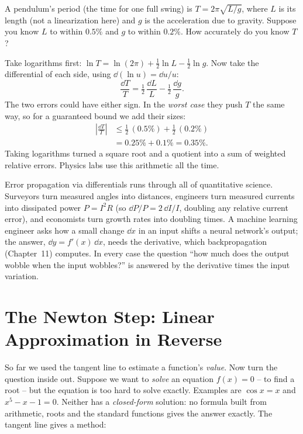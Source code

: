 \begin{example}
\label{ch14:ex-combine}
A pendulum's period (the time for one full swing) is $T = 2\pi\sqrt{L/g}$, where
$L$ is its length (not a linearization here) and $g$ is the acceleration due to
gravity. Suppose you know $L$ to within
$0.5\%$ and $g$ to within $0.2\%$. How accurately do you know $T$?

Take logarithms first: $\ln T = \ln(2\pi) + \tfrac12\ln L - \tfrac12 \ln g$.
Now take the differential of each side, using $\dd(\ln u)=\dd u/u$:
\[
\frac{\dd T}{T} = \tfrac12\,\frac{\dd L}{L} - \tfrac12\,\frac{\dd g}{g}.
\]
The two errors could have either sign. In the \emph{worst case} they push $T$ the
same way, so for a guaranteed bound we add their sizes:
\begin{align*}
\left|\frac{\dd T}{T}\right| &\le \tfrac12\,(0.5\%) + \tfrac12\,(0.2\%)\\
&= 0.25\% + 0.1\% = 0.35\%.
\end{align*}
Taking logarithms turned a square root and a quotient into a sum of weighted
relative errors. Physics labs use this arithmetic all the time.
\end{example}

\begin{applicationbox}
Error propagation via differentials runs through all of quantitative science.
Surveyors turn measured angles into distances, engineers turn
measured currents into dissipated power $P=I^2R$ (so $\dd P/P = 2\,\dd I/I$, doubling any relative current error),
and economists turn growth rates into doubling times. A machine
learning engineer asks how a small change $\dd x$ in an input shifts a neural
network's output; the answer, $\dd y = f'(x)\,\dd x$, needs the derivative, which
backpropagation (Chapter~11) computes. In every case the question ``how
much does the output wobble when the input wobbles?'' is answered by the
derivative times the input variation.
\end{applicationbox}

\section{The Newton Step: Linear Approximation in Reverse}
\label{ch14:newton}

So far we used the tangent line to estimate a function's \emph{value}. Now turn
the question inside out. Suppose we want to \emph{solve} an equation $f(x)=0$ --
to find a root -- but the equation is too hard to solve exactly. Examples are
$\cos x = x$ and $x^5 - x - 1 = 0$. Neither has a \emph{closed-form} solution: no
formula built from arithmetic, roots and the standard functions gives the answer
exactly. The tangent line gives a method:

